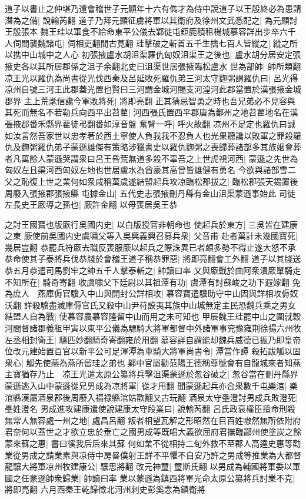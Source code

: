 道子以書止之仲堪乃還會稽世子元顯年十六有儁才為侍中說道子以王殷終必為患請潛為之備|{
	說輸芮翻}
道子乃拜元顯征虜將軍以其衛府及徐州文武悉配之|{
	為元顯討王殷張本}
魏王珪以軍食不給命東平公儀去鄴徙屯鉅鹿積租楊城慕容詳出步卒六千人伺間襲魏諸屯|{
	伺相吏翻間古莧翻}
珪擊破之斬首五千生擒七百人皆縱之|{
	縱之所以携中山城中之人心}
初張掖盧水胡沮渠羅仇匈奴沮渠王之後也|{
	盧水胡分居安定張掖史各以其所居郡係之沮子余翻北史曰沮渠世居張掖臨松盧水}
世為部帥|{
	帥所類翻}
凉王光以羅仇為尚書從光伐西秦及呂延敗死羅仇弟三河太守麴粥謂羅仇曰|{
	呂光得凉州自號三河王此郡蓋光置也賢曰三河謂金城河賜支河湟河此郡當置於漢張掖金城郡界}
主上荒耄信讒今軍敗將死|{
	將即亮翻}
正其猜忌智勇之時也吾兄弟必不見容與其死而無名不若勒兵向西平出苕藋|{
	河西張氏置西平郡唐為鄯州之地苕藋地名在漢張掖郡番禾縣界藋徒弔翻番如淳音盤}
奮臂一呼|{
	呼火故翻}
凉州不足定也羅仇曰誠如汝言然吾家世以忠孝著於西土寧使人負我我不忍負人也光果聽讒以敗軍之罪殺羅仇及麴粥羅仇弟子蒙遜雄傑有策略涉獵書史以羅仇麴粥之喪歸葬諸部多其族姻會葬者凡萬餘人蒙遜哭謂衆曰呂王昏荒無道多殺不辜吾之上世虎視河西|{
	蒙遜之先世為匈奴左且渠河西匈奴左地也世居盧水為酋豪其高曾皆雄健有勇名}
今欲與諸部雪二父之恥復上世之業何如衆咸稱萬歲遂結盟起兵攻凉臨松郡拔之|{
	臨松郡張天錫置後周廢入張掖郡張掖縣}
屯據金山|{
	五代史志張掖刪丹縣有金山沮渠蒙遜事始此}
司徒左長史王廞導之孫也|{
	廞許金翻}
以母喪居吳王恭

之討王國寶也版廞行吳國内史|{
	以白版授官非朝命也}
使起兵於東方|{
	三吳皆在建康之東}
廞使前吳國内史虞嘯父等入吳興義興召募兵衆|{
	父音甫}
赴者萬計未幾國寶死|{
	幾居豈翻}
恭罷兵符廞去職反喪服廞以起兵之際誅異已者頗多勢不得止遂大怒不承恭命使其子泰將兵伐恭牋於會稽王道子稱恭罪惡|{
	將即亮翻會工外翻}
道子以其牋送恭五月恭遣司馬劉牢之帥五千人擊泰斬之|{
	帥讀曰率}
又與廞戰於曲阿衆潰廞單騎走不知所在|{
	騎奇寄翻}
收虞嘯父下廷尉以其祖潭有功|{
	虞潭有討蘇峻之功下遐嫁翻}
免為庶人　燕庫傉官驥入中山與開封公詳相攻|{
	慕容寶遣驥助守中山因與詳相攻傉奴沃翻}
詳殺驥盡滅庫傉官氏又殺中山尹苻謨夷其族中山城無定主民恐魏兵乘之男女結盟人自為戰|{
	使慕容農慕容隆留中山而用之未可知也}
甲辰魏王珪罷中山之圍就穀河間督諸郡義租甲寅以東平公儀為驃騎大將軍都督中外諸軍事兖豫雍荆徐揚六州牧左丞相封衛王|{
	驃匹妙翻騎奇寄翻雍於用翻}
慕容詳自謂能却魏兵威德已振乃即皇帝位改元建始置百官以新平公可足渾潭為車騎大將軍尚書令|{
	潭當作譚}
殺拓跋觚以固衆心|{
	觚先使燕為燕所留珪之弟也}
鄴中官屬勸范陽王德稱尊號會有自龍城來者知燕主寶猶存乃止　凉王光遣太原公纂將兵擊沮渠蒙遜於怱谷破之|{
	怱谷當在刪丹縣界}
蒙遜逃入山中蒙遜從兄男成為凉將軍|{
	從才用翻}
聞蒙遜起兵亦合衆數千屯樂涫|{
	樂涫縣漢屬酒泉郡後周廢入福禄縣涫姑歡翻又古玩翻}
酒泉太守壘澄討男成兵敗澄死|{
	壘姓澄名}
男成進攻建康遣使說建康太守段業曰|{
	說輸芮翻}
呂氏政衰權臣擅命刑殺無常人無容處一州之地|{
	處昌呂翻}
叛者相望瓦解之形昭然在目百姓嗷然無所依附府君奈何以蓋世之才欲立忠於垂亡之國男成等既唱大義欲屈府君撫臨鄙州使塗炭之餘蒙來蘇之惠|{
	書曰徯我后后來其蘇}
何如業不從相持二旬外救不至郡人高逵史惠等勸業從男成之請業素與凉侍中房晷僕射王詳不平懼不自安乃許之男成等推業為大都督龍驤大將軍凉州牧建康公|{
	驤思將翻}
改元神璽|{
	璽斯氏翻}
以男成為輔國將軍委以軍國之任蒙遜帥衆歸業|{
	帥讀曰率}
業以蒙遜為鎮西將軍光命太原公纂將兵討業不克|{
	將即亮翻}
六月西秦王乾歸徵北河州刺史彭奚念為鎮衛將

